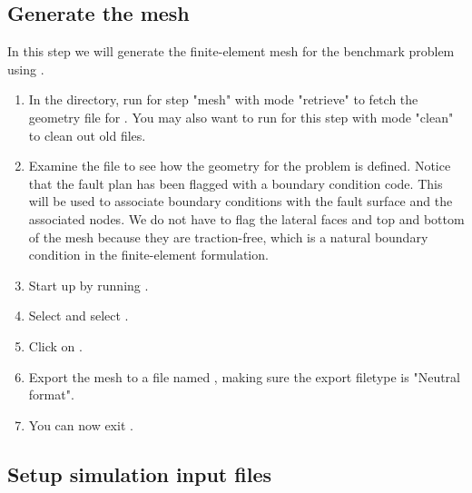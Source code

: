 \subsection{Generate the mesh}

In this step we will generate the finite-element mesh for the
benchmark problem using .

\begin{enumerate}
\item In the  directory, run
   for step "mesh" with mode "retrieve" to fetch the
  geometry file for . You may also want to run
   for this step with mode "clean" to clean out old
  files.

  \begin{screen}
    \shellprompt{}
    \shellprompt{}
  \end{screen}
  
\item Examine the  file to see how the geometry
  for the problem is defined. Notice that the fault plan has
  been flagged with a boundary condition code. This will be
  used to associate boundary conditions with the fault surface and the
  associated nodes. We do not have to flag the lateral faces and top
  and bottom of the mesh because they are traction-free, which is a
  natural boundary condition in the finite-element formulation.
\item Start up  by running .

  \begin{screen}
    \shellprompt{}
  \end{screen}
  
\item Select \guiselect{}
  and select .
\item Click on .
\item Export the mesh to a file named ,
  making sure the export filetype is "Neutral format".
\item You can now exit .
\end{enumerate}

\subsection{Setup simulation input files}

